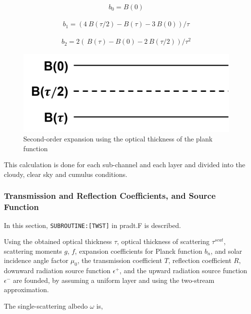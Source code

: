 \begin{eqnarray}
b_{0}=B(0)
\end{eqnarray}

\begin{eqnarray}
b_{1}=(4{~B}(\tau / 2)-{B}(\tau)-3{~B}(0)) / \tau
\end{eqnarray}

\begin{eqnarray}
b_{2}=2({~B}(\tau)-{B}(0)-2{~B}(\tau / 2)) / \tau^{2}
\end{eqnarray}

\begin{figure}
\centering
\includegraphics{../figures/Prad_Fig2.png}
\caption{Second-order expansion using the optical thickness of the plank function}
\end{figure}

This calculation is done for each sub-channel and each layer and divided into the cloudy, clear sky and cumulus conditions.

\hypertarget{transmission-and-reflection-coefficients-and-source-function}{%
\subsubsection{Transmission and Reflection Coefficients, and Source Function}\label{transmission-and-reflection-coefficients-and-source-function}}

In this section, \texttt{SUBROUTINE:{[}TWST{]}} in pradt.F is described.

Using the obtained optical thickness \(\tau\), optical thickness of scattering \(\tau^{scat}\), scattering moments \(g\), \(f\), expansion coefficients for Planck function \(b_n\), and solar incidence
angle factor \(\mu_{0}\), the transmission coefficient \(T\), reflection coefficient \(R\), downward radiation source function \(\epsilon^{+}\), and the upward radiation source function
\(\epsilon^{-}\) are founded, by assuming a uniform layer and using the two-stream approximation.

The single-scattering albedo \(\omega\) is,

